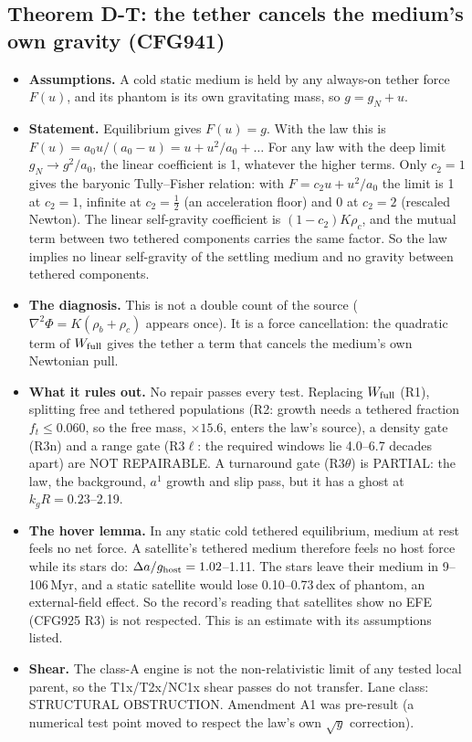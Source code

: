 \documentclass[10pt]{article}
\begin{document}
\subsection{Theorem D-T: the tether cancels the medium's own gravity (CFG941)}
\begin{itemize}
\item \textbf{Assumptions.} A cold static medium is held by any always-on tether force $F(u)$, and its phantom is its own gravitating mass, so $g=g_N+u$.
\item \textbf{Statement.} Equilibrium gives $F(u)=g$. With the law this is $F(u)=a_0u/(a_0-u)=u+u^2/a_0+\dots$ For any law with the deep limit $g_N\to g^2/a_0$, the linear coefficient is 1, whatever the higher terms. Only $c_2=1$ gives the baryonic Tully--Fisher relation: with $F=c_2u+u^2/a_0$ the limit is 1 at $c_2=1$, infinite at $c_2=\tfrac12$ (an acceleration floor) and 0 at $c_2=2$ (rescaled Newton). The linear self-gravity coefficient is $(1-c_2)K\rho_c$, and the mutual term between two tethered components carries the same factor. So the law implies no linear self-gravity of the settling medium and no gravity between tethered components.
\item \textbf{The diagnosis.} This is not a double count of the source ($\nabla^2\Phi=K(\rho_b+\rho_c)$ appears once). It is a force cancellation: the quadratic term of $W_{\rm full}$ gives the tether a term that cancels the medium's own Newtonian pull.
\item \textbf{What it rules out.} No repair passes every test. Replacing $W_{\rm full}$ (R1), splitting free and tethered populations (R2: growth needs a tethered fraction $f_t\le0.060$, so the free mass, $\times15.6$, enters the law's source), a density gate (R3n) and a range gate (R3$\ell$: the required windows lie 4.0--6.7 decades apart) are NOT REPAIRABLE. A turnaround gate (R3$\theta$) is PARTIAL: the law, the background, $a^1$ growth and slip pass, but it has a ghost at $k_gR=0.23$--2.19.
\item \textbf{The hover lemma.} In any static cold tethered equilibrium, medium at rest feels no net force. A satellite's tethered medium therefore feels no host force while its stars do: $\Delta a/g_{\rm host}=1.02$--1.11. The stars leave their medium in 9--106\,Myr, and a static satellite would lose 0.10--0.73\,dex of phantom, an external-field effect. So the record's reading that satellites show no EFE (CFG925 R3) is not respected. This is an estimate with its assumptions listed.
\item \textbf{Shear.} The class-A engine is not the non-relativistic limit of any tested local parent, so the T1x/T2x/NC1x shear passes do not transfer. Lane class: STRUCTURAL OBSTRUCTION. Amendment A1 was pre-result (a numerical test point moved to respect the law's own $\sqrt y$ correction).
\end{itemize}
\end{document}
